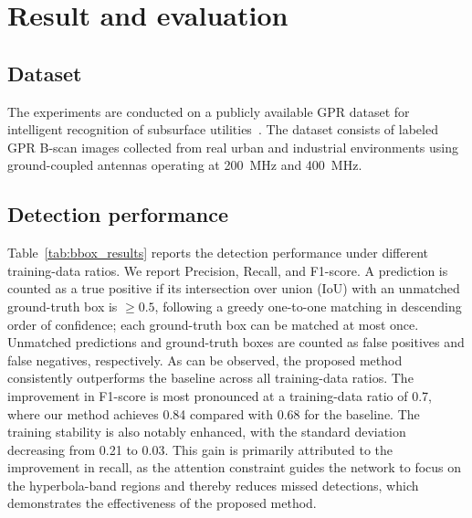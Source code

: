 \documentclass[lettersize,journal]{IEEEtran}
\begin{document}
\section{Result and evaluation}
\subsection{Dataset}
%
The experiments are conducted on a publicly available GPR dataset for intelligent recognition of subsurface utilities~\cite{dataset}.
The dataset consists of labeled GPR B-scan images collected from real urban and industrial environments using ground-coupled antennas operating at 200~MHz and 400~MHz.


\subsection{Detection performance}


Table~\ref{tab:bbox_results} reports the detection performance under different training-data ratios. 
We report Precision, Recall, and F1-score. 
A prediction is counted as a true positive if its intersection over union (IoU) 
with an unmatched ground-truth box is $\geq 0.5$, 
following a greedy one-to-one matching in descending order of confidence; 
each ground-truth box can be matched at most once. 
Unmatched predictions and ground-truth boxes are counted as false positives and false negatives, respectively.
As can be observed, the proposed method consistently outperforms the baseline across all training-data ratios. 
The improvement in F1-score is most pronounced at a training-data ratio of 0.7, 
where our method achieves 0.84 compared with 0.68 for the baseline. 
The training stability is also notably enhanced, with the standard deviation decreasing from 0.21 to 0.03. 
This gain is primarily attributed to the improvement in recall, 
as the attention constraint guides the network to focus on the hyperbola-band regions 
and thereby reduces missed detections, which demonstrates the effectiveness of the proposed method.
\end{document}
